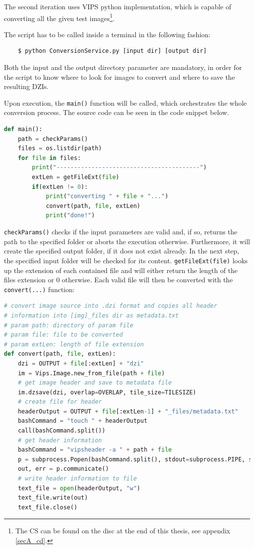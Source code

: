 The second iteration uses VIPS python implementation, which is capable of converting all the given test images\footnote{
	The CS can be found on the disc at the end of this thesis, see appendix \ref{secA_cd}.
}.

The script has to be called inside a terminal in the following fashion:

\begin{lstlisting}
	$ python ConversionService.py [input dir] [output dir]
\end{lstlisting}

Both the input and the output directory parameter are mandatory, in order for the script to know where to look for images to convert and where to save the resulting DZIs.

Upon execution, the \texttt{main()} function will be called, which orchestrates the whole conversion process. The source code can be seen in the code snippet below.
\clearpage

\begin{lstlisting}[frame=single, language=python]
def main():
	path = checkParams()
	files = os.listdir(path)
	for file in files:
		print("-----------------------------------------")
		extLen = getFileExt(file)
		if(extLen != 0):
			print("converting " + file + "...")
			convert(path, file, extLen)
			print("done!")
\end{lstlisting}

\texttt{checkParams()} checks if the input parameters are valid and, if so, returns the path to the specified folder or aborts the execution otherwise. Furthermore, it will create the specified output folder, if it does not exist already. In the next step, the specified input folder will be checked for its content. \texttt{getFileExt(file)} looks up the extension of each contained file and will either return the length of the files extension or $0$ otherwise. Each valid file will then be converted with the \texttt{convert(...)} function:

\begin{lstlisting}[frame=single, language=python]
# convert image source into .dzi format and copies all header 
# information into [img]_files dir as metadata.txt
# param path: directory of param file
# param file: file to be converted
# param extLen: length of file extension
def convert(path, file, extLen):
	dzi = OUTPUT + file[:extLen] + "dzi"
	im = Vips.Image.new_from_file(path + file)
	# get image header and save to metadata file
	im.dzsave(dzi, overlap=OVERLAP, tile_size=TILESIZE)
	# create file for header
	headerOutput = OUTPUT + file[:extLen-1] + "_files/metadata.txt"
	bashCommand = "touch " + headerOutput
	call(bashCommand.split())
	# get header information
	bashCommand = "vipsheader -a " + path + file
	p = subprocess.Popen(bashCommand.split(), stdout=subprocess.PIPE, stderr=subprocess.PIPE)
	out, err = p.communicate()
	# write header information to file
	text_file = open(headerOutput, "w")
	text_file.write(out)
	text_file.close()
\end{lstlisting}

